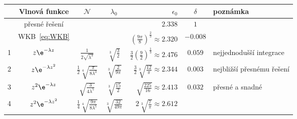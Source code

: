 \begin{solution}
\begin{enumerate}
            \begin{table}[!htb]
                \centering
                \begin{tabular}{|c|c|c|c|r|c|l|}
                    \hline
                        & Vlnová funkce 
                        & $\mathcal{N}$ 
                        & $\lambda_{0}$ 
                        & $\epsilon_{0}$ 
                        & $\delta$ 
                        & poznámka \\
                    \hline
                    \hline
                        & přesné řešení 
                        & 
                        & 
                        & $\mathbf{2.338}$ 
                        & $1$
                        & \\
                    \hline
                        & WKB~\eqref{eq:WKB}
                        & 
                        & 
                        & $\left(\frac{9\pi}{8}\right)^{\frac{2}{3}}\approx2.320$ 
                        & $-0.008$
                        & \\
                    \hline
                    1
                        & $z\e^{-\lambda z}$ 
                        & $\frac{1}{2\sqrt{\lambda^{3}}}$ 
                        & $\sqrt[3]{\frac{3}{2}}$ 
                        & $\frac{3}{2}\left(\frac{9}{2}\right)^{\frac{1}{3}}\approx2.476$ 
                        & $0.059$
                        & nejjednodušší integrace \\
                    \hline
                    2
                        & $z\e^{-\lambda z^{2}}$ 
                        & $\frac{1}{2}\sqrt[4]{\frac{\pi}{8\lambda^{3}}}$ 
                        & $\sqrt[3]{\frac{2}{9\pi}}$ 
                        & $\frac{3}{2}\sqrt[3]{\frac{12}{\pi}}\approx2.344$ 
                        & $0.003$
                        & nejbližší přesnému řešení \\
                    \hline
                    3
                        & $z^{2}\e^{-\lambda z}$ 
                        & $\sqrt{\frac{3}{4\lambda^{5}}}$
                        & $\sqrt[3]{\frac{15}{2}}$ 
                        & $\sqrt{\frac{225}{16}}\approx2.413$ 
                        & $0.032$
                        & přesné a snadné \\
                        \hline
                    4
                        & $z^{2}\e^{-\lambda z^{2}}$ 
                        & $\frac{1}{4}\sqrt[4]{\frac{9\pi}{8\lambda^{5}}}$
                        & $\sqrt[3]{\frac{32}{49\pi}}$ 
                        & $2\sqrt[3]{\frac{7}{\pi}}\approx2.612$ 

\end{tabular}
\end{table}
\end{enumerate}
\end{solution}
